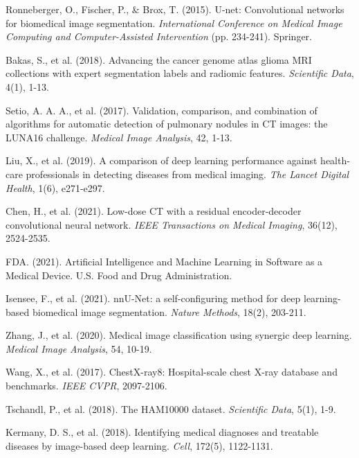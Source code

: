 \documentclass[12pt,a4paper]{article}
\begin{document}
\begin{thebibliography}{99}

Ronneberger, O., Fischer, P., \& Brox, T. (2015). U-net: Convolutional networks for biomedical image segmentation. \textit{International Conference on Medical Image Computing and Computer-Assisted Intervention} (pp. 234-241). Springer.

Bakas, S., et al. (2018). Advancing the cancer genome atlas glioma MRI collections with expert segmentation labels and radiomic features. \textit{Scientific Data}, 4(1), 1-13.

Setio, A. A. A., et al. (2017). Validation, comparison, and combination of algorithms for automatic detection of pulmonary nodules in CT images: the LUNA16 challenge. \textit{Medical Image Analysis}, 42, 1-13.

Liu, X., et al. (2019). A comparison of deep learning performance against health-care professionals in detecting diseases from medical imaging. \textit{The Lancet Digital Health}, 1(6), e271-e297.

Chen, H., et al. (2021). Low-dose CT with a residual encoder-decoder convolutional neural network. \textit{IEEE Transactions on Medical Imaging}, 36(12), 2524-2535.

FDA. (2021). Artificial Intelligence and Machine Learning in Software as a Medical Device. U.S. Food and Drug Administration.

Isensee, F., et al. (2021). nnU-Net: a self-configuring method for deep learning-based biomedical image segmentation. \textit{Nature Methods}, 18(2), 203-211.

Zhang, J., et al. (2020). Medical image classification using synergic deep learning. \textit{Medical Image Analysis}, 54, 10-19.

Wang, X., et al. (2017). ChestX-ray8: Hospital-scale chest X-ray database and benchmarks. \textit{IEEE CVPR}, 2097-2106.

Tschandl, P., et al. (2018). The HAM10000 dataset. \textit{Scientific Data}, 5(1), 1-9.

Kermany, D. S., et al. (2018). Identifying medical diagnoses and treatable diseases by image-based deep learning. \textit{Cell}, 172(5), 1122-1131.


\end{thebibliography}
\end{document}
